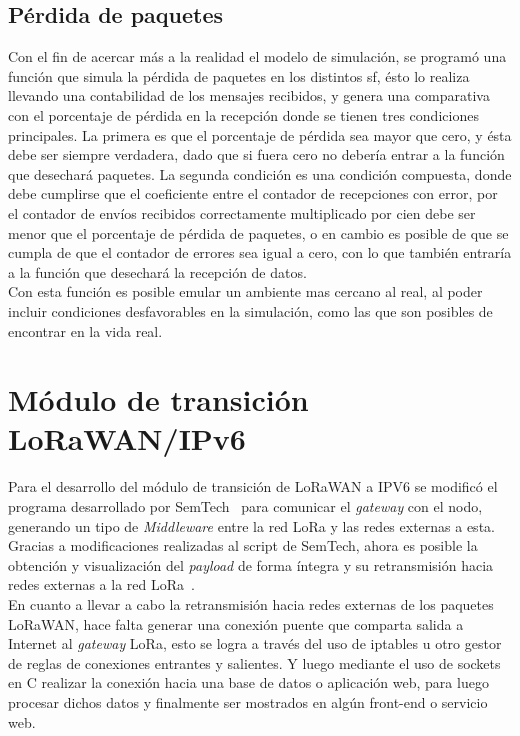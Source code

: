 \begin{justify}
\subsection{Pérdida de paquetes}
Con el fin de acercar más a la realidad el modelo de simulación, se programó una función que simula la pérdida de paquetes en los distintos \gls{sf}, ésto lo realiza llevando una contabilidad de los mensajes recibidos, y genera una comparativa con el porcentaje de pérdida en la recepción donde se tienen tres condiciones principales. La primera es que el porcentaje de pérdida sea mayor que cero, y ésta debe ser siempre verdadera, dado que si fuera cero no debería entrar a la función que desechará paquetes. La segunda condición es una condición compuesta, donde debe cumplirse que el coeficiente entre el contador de recepciones con error, por el contador de envíos recibidos correctamente multiplicado por cien debe ser menor que el porcentaje de pérdida de paquetes, o en cambio es posible de que se cumpla de que el contador de errores sea igual a cero, con lo que también entraría a la función que desechará la recepción de datos.\\
Con esta función es posible emular un ambiente mas cercano al real, al poder incluir condiciones desfavorables en la simulación, como las que son posibles de encontrar en la vida real.

\section{Módulo de transición LoRaWAN/IPv6}
Para el desarrollo del módulo de transición de LoRaWAN a IPV6 se modificó el programa desarrollado por SemTech~\cite{script} para comunicar el \textit{gateway} con el nodo, generando un tipo de \textit{Middleware} entre la red LoRa y las redes externas a esta.\newpage \noindent
Gracias a modificaciones realizadas al script de SemTech, ahora es posible la obtención y visualización del \textit{payload} de forma íntegra y su retransmisión hacia redes externas a la red LoRa~\cite{tomas}.\\
En cuanto a llevar a cabo la retransmisión hacia redes externas de los paquetes LoRaWAN, hace falta generar una conexión puente que comparta salida a Internet al \textit{gateway} LoRa, esto se logra a través del uso de iptables u otro gestor de reglas de conexiones entrantes y salientes. Y luego mediante el uso de \glspl{socket} en C realizar la conexión hacia una base de datos o aplicación web, para luego procesar dichos datos y finalmente ser mostrados en algún front-end o servicio web.

\end{justify}
